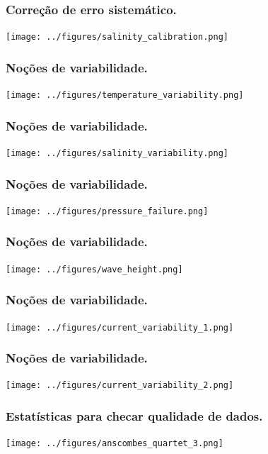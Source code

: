 \begin{frame}
\frametitle{Correção de erro sistemático.}
    \begin{center}
        \texttt{[image: ../figures/salinity\_calibration.png]}
    \end{center}
\end{frame}

\begin{frame}
\frametitle{Noções de variabilidade.}
    \begin{center}
        \texttt{[image: ../figures/temperature\_variability.png]}
    \end{center}
\end{frame}

\begin{frame}
\frametitle{Noções de variabilidade.}
    \begin{center}
        \texttt{[image: ../figures/salinity\_variability.png]}
    \end{center}
\end{frame}

\begin{frame}
\frametitle{Noções de variabilidade.}
    \begin{center}
        \texttt{[image: ../figures/pressure\_failure.png]}
    \end{center}
\end{frame}

\begin{frame}
\frametitle{Noções de variabilidade.}
    \begin{center}
        \texttt{[image: ../figures/wave\_height.png]}
    \end{center}
\end{frame}

\begin{frame}
\frametitle{Noções de variabilidade.}
    \begin{center}
        \texttt{[image: ../figures/current\_variability\_1.png]}
    \end{center}
\end{frame}

\begin{frame}
\frametitle{Noções de variabilidade.}
    \begin{center}
        \texttt{[image: ../figures/current\_variability\_2.png]}
    \end{center}
\end{frame}

\begin{frame}
\frametitle{Estatísticas para checar qualidade de dados.}
    \begin{center}
        \texttt{[image: ../figures/anscombes\_quartet\_3.png]}
    \end{center}
\end{frame}

